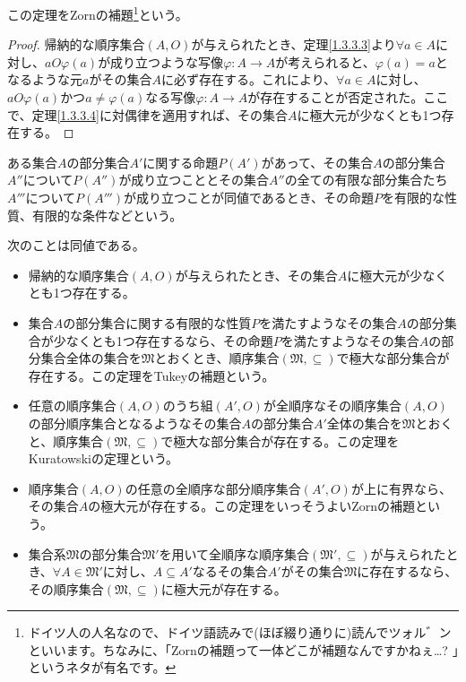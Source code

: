 \documentclass[dvipdfmx]{jsarticle}
\begin{document}
この定理をZornの補題\footnote{ドイツ人の人名なので、ドイツ語読みで(ほぼ綴り通りに)読んでツォル゛ンといいます。ちなみに、「Zornの補題って一体どこが補題なんですかねぇ…? 」というネタが有名です。}という。
\begin{proof} 帰納的な順序集合$(A,O)$が与えられたとき、定理\ref{1.3.3.3}より$\forall a \in A$に対し、$aO\varphi(a)$が成り立つような写像$\varphi:A \rightarrow A$が考えられると、$\varphi(a) = a$となるような元$a$がその集合$A$に必ず存在する。これにより、$\forall a \in A$に対し、$aO\varphi(a)$かつ$a \neq \varphi(a)$なる写像$\varphi:A \rightarrow A$が存在することが否定された。ここで、定理\ref{1.3.3.4}に対偶律を適用すれば、その集合$A$に極大元が少なくとも1つ存在する。
\end{proof}
\begin{dfn}
ある集合$A$の部分集合$A'$に関する命題$P\left( A' \right)$があって、その集合$A$の部分集合$A''$について$P\left( A'' \right)$が成り立つこととその集合$A''$の全ての有限な部分集合たち$A'''$について$P\left( A''' \right)$が成り立つことが同値であるとき、その命題$P$を有限的な性質、有限的な条件などという。
\end{dfn}
\begin{thm}\label{1.3.3.6}
次のことは同値である。
\begin{itemize}
\item
  帰納的な順序集合$(A,O)$が与えられたとき、その集合$A$に極大元が少なくとも1つ存在する。
\item
  集合$A$の部分集合に関する有限的な性質$P$を満たすようなその集合$A$の部分集合が少なくとも1つ存在するなら、その命題$P$を満たすようなその集合$A$の部分集合全体の集合を$\mathfrak{M}$とおくとき、順序集合$\mathfrak{(M, \subseteq )}$で極大な部分集合が存在する。この定理をTukeyの補題という。
\item
  任意の順序集合$(A,O)$のうち組$\left( A',O \right)$が全順序なその順序集合$(A,O)$の部分順序集合となるようなその集合$A$の部分集合$A'$全体の集合を$\mathfrak{M}$とおくと、順序集合$\mathfrak{(M, \subseteq )}$で極大な部分集合が存在する。この定理をKuratowskiの定理という。
\item
  順序集合$(A,O)$の任意の全順序な部分順序集合$(A',O)$が上に有界なら、その集合$A$の極大元が存在する。この定理をいっそうよいZornの補題という。
\item
  集合系$\mathfrak{M}$の部分集合$\mathfrak{M}'$を用いて全順序な順序集合$\left( \mathfrak{M}', \subseteq \right)$が与えられたとき、$\forall A \in \mathfrak{M}'$に対し、$A \subseteq A'$なるその集合$A'$がその集合$\mathfrak{M}$に存在するなら、その順序集合$\left( \mathfrak{M, \subseteq} \right)$に極大元が存在する。
\end{itemize}
\end{thm}
\end{document}

